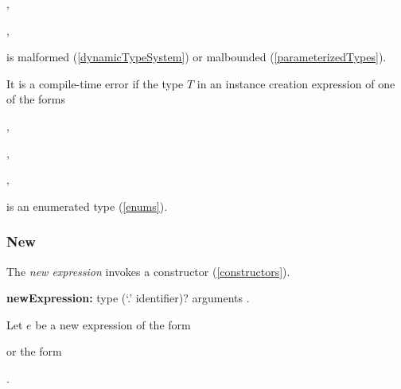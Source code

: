 \documentclass{article}
\begin{document}
,

,

is malformed (\ref{dynamicTypeSystem}) or malbounded (\ref{parameterizedTypes}).

\LMHash{}
It is a compile-time error if the type $T$ in an instance creation expression of one of the forms

,

,

,


is an enumerated type (\ref{enums}).


\subsubsection{New}

\LMHash{}
The {\em new expression} invokes a constructor (\ref{constructors}).

\begin{grammar}
{\bf newExpression:}\NEW{} type (`{\escapegrammar .}' identifier)? arguments
  .
\end{grammar}

\LMHash{}
Let $e$ be a new expression of the form

or the form

.


\end{document}
